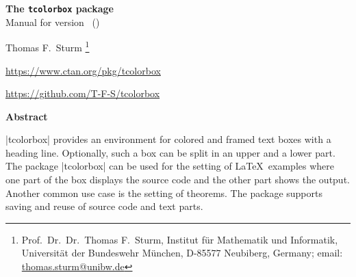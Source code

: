 \tcbuselistingtext
{}


\clearpage
\begin{center}
\begin{tcolorbox}[enhanced,hbox,tikznode,left=8mm,right=8mm,boxrule=0.4pt,
  colback=white,colframe=black!50!yellow,
  drop lifted shadow=black!50!yellow,arc is angular,
  before=\par\vspace*{5mm},after=\par\bigskip]
{\bfseries\LARGE The \texttt{tcolorbox} package}\\[3mm]
{\large Manual for version \version\ (\datum)}
\end{tcolorbox}
{\large Thomas F.~Sturm%
  \footnote{Prof.~Dr.~Dr.~Thomas F.~Sturm, Institut f\"{u}r Mathematik und Informatik,
    Universit\"{a}t der Bundeswehr M\"{u}nchen, D-85577 Neubiberg, Germany;
     email: \href{mailto:thomas.sturm@unibw.de}{thomas.sturm@unibw.de}}\par\medskip
\normalsize\url{https://www.ctan.org/pkg/tcolorbox}\par
\url{https://github.com/T-F-S/tcolorbox}}
\end{center}
\bigskip
\begin{absquote}
  \begin{center}\bfseries Abstract\end{center}
  |tcolorbox| provides an environment for colored and framed text boxes with a
  heading line. Optionally, such a box can be split in an upper and a lower
  part. The package |tcolorbox| can be used for the setting of \LaTeX\ examples where
  one part of the box displays the source code and the other part shows the
  output. Another common use case is the setting of theorems. The package supports
  saving and reuse of source code and text parts.
\end{absquote}

